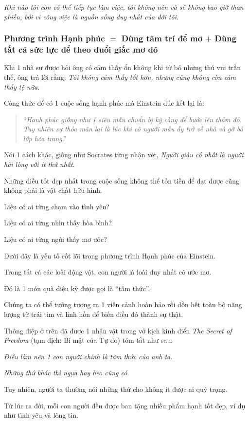 \documentclass{article}
\begin{document}
\textit{Khi nào tôi còn có thể tiếp tục làm việc, tôi không nên và sẽ không bao giờ than phiền, bởi vì công việc là nguồn sống duy nhất của đời tôi}.

\subsubsection{Phương trình Hạnh phúc $=$ Dùng tâm trí để mơ $+$ Dùng tất cả sức lực để theo đuổi giấc mơ đó}
Khi 1 nhà sư được hỏi ông có cảm thấy ổn không khi từ bỏ những thú vui trần thế, ông trả lời rằng: \textit{Tôi không cảm thấy tốt hơn, nhưng cũng không còn cảm thấy tệ nữa}.

%
Công thức để có 1 cuộc sống hạnh phúc mà Einstein đúc kết lại là:
\begin{quotation}
	``\textit{Hạnh phúc giống như 1 siêu mẫu chuẩn bị kỹ càng để  bước lên thảm đỏ. Tuy nhiên sự thỏa mãn lại là lúc khi cô người mẫu ấy trở về nhà và gỡ bỏ lớp hóa trang}.''
\end{quotation}
Nói 1 cách khác, giống như Socrates từng nhận xét, \textit{Người giàu có nhất là người hài lòng với ít thứ nhất}.

%
Những điều tốt đẹp nhất trong cuộc sống không thể tốn tiền để đạt được cũng  không phải là vật chất hữu hình.

Liệu có ai từng chạm vào tình yêu?

Liệu có ai từng nhìn thấy hòa bình?

Liệu có ai từng ngửi thấy mơ ước?

Dưới đây là yếu tố cốt lõi trong phương trình Hạnh phúc của Einstein.

%
Trong tất cả các loài động vật, con người là loài duy nhất có ước mơ.

Đó là 1 món quà diệu kỳ được gọi là ``tâm thức''.

Chúng ta có thể tưởng tượng ra 1 viễn cảnh hoàn hảo rồi dồn hết toàn bộ năng lượng từ trái tim và linh hồn để biến điều đó thành sự thật.

%
Thông điệp ở trên đã được 1 nhân vật trong vở kịch kinh điển \textit{The Secret of Freedom} (tạm dịch: Bí mật của Tự do) tóm tắt như sau:

%
\textit{Điều làm nên 1 con người chính là tâm thức của anh ta}.

\textit{Những thứ khác thì ngựa hay heo cũng có}.

%
Tuy nhiên, người ta thường nói những thứ cho không ít được ai quý trọng.

%
Từ lúc ra đời, mỗi con người đều được ban tặng nhiều phẩm hạnh tốt đẹp, ví dụ như tình yêu và lòng tin.
\end{document}
